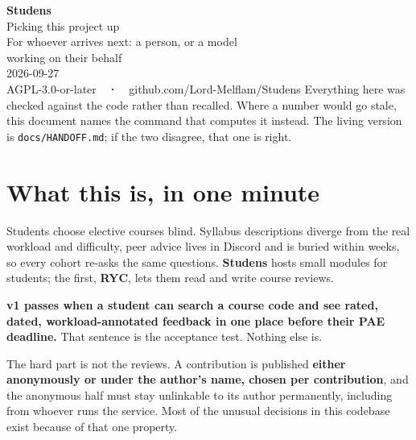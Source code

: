 \documentclass[11pt,a4paper]{article}
\begin{document}
\begin{titlepage}
\centering
\vspace*{3cm}
{\sffamily\Huge\bfseries\color{studens} Studens}\\[0.6em]
{\sffamily\LARGE Picking this project up}\\[2em]
{\sffamily\large\color{muted} For whoever arrives next: a person, or a model\\
working on their behalf}\\[3em]
{\sffamily\normalsize\color{muted} 2026-09-27}\\[0.4em]
{\sffamily\footnotesize\color{muted} AGPL-3.0-or-later\ \ \textbf{·}\ \
github.com/Lord-Melflam/Studens}
\vfill
{\sffamily\footnotesize\color{muted}
Everything here was checked against the code rather than recalled. Where a
number would go stale, this document names the command that computes it
instead. The living version is \texttt{docs/HANDOFF.md}; if the two disagree,
that one is right.}
\end{titlepage}

\tableofcontents
\newpage

\section{What this is, in one minute}

Students choose elective courses blind. Syllabus descriptions diverge from the
real workload and difficulty, peer advice lives in Discord and is buried within
weeks, so every cohort re-asks the same questions. \textbf{Studens} hosts small
modules for students; the first, \textbf{RYC}, lets them read and write course
reviews.

\begin{why}
\textbf{v1 passes when a student can search a course code and see rated, dated,
workload-annotated feedback in one place before their PAE deadline.} That
sentence is the acceptance test. Nothing else is.
\end{why}

The hard part is not the reviews. A contribution is published \textbf{either
anonymously or under the author's name, chosen per contribution}, and the
anonymous half must stay unlinkable to its author permanently, including from
whoever runs the service. Most of the unusual decisions in this codebase exist
because of that one property.

\end{document}
